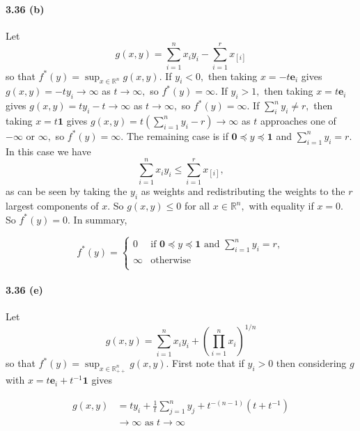 \documentclass[a4paper,12pt]{article}
\newcommand{\p}{\prod}
\newcommand{\e}{\mathbf{e}}
\begin{document}
\paragraph*{3.36 (b)}
Let $$g(x,y) = \sum_{i=1}^n x_i y_i - \sum_{i=1}^r x_{[i]}$$ so that $f^*(y) = \sup_{x\in \mathbb{R}^n} g(x,y).$
\newline
If $y_i < 0,$ then taking $ x = -t \e_i$ gives $g(x,y) = -ty_i \to \infty$ as $t\to\infty,$ so $f^*(y) = \infty.$
\newline
If $y_i > 1,$ then taking $x = t\e_i$ gives $g(x,y) = t y_i -t \to \infty$ as $t \to \infty,$ so $f^*(y) = \infty.$ 
\newline
If $\sum_{i}^n y_i \neq r,$ then taking $x = t \mathbf{1}$ gives $g(x,y) = t(\sum_{i=1}^n y_i -r) \to \infty$ as $t$ approaches one of $-\infty$ or $\infty,$ so $f^*(y) = \infty.$  
\newline
The remaining case is if $\mathbf{0} \preceq y \preceq \mathbf{1}$ and $\sum_{i=1}^n y_i = r.$ In this case we have $$\sum_{i=1}^n x_i y_i \leq \sum_{i=1}^r x_{[i]},$$ as can be seen by taking the $y_i$ as weights and redistributing the weights to the $r$ largest components of $x.$ So $g(x,y) \leq 0$ for all $x \in \mathbb{R}^n,$ with equality if $x=0.$ So $f^*(y) = 0.$ 
\newline
In summary, 

\[
  f^*(y) =
  \begin{cases}
                                   0 & \text{if $\mathbf{0} \preceq y \preceq \mathbf{1}$ and $\sum_{i=1}^n y_i = r,$} \\
                                   \infty & \text{otherwise} \\
  \end{cases}
\]

\paragraph*{3.36 (e)}

Let $$g(x,y) = \sum_{i=1}^n x_i y_i + \left(\p_{i=1}^n x_i \right)^{1/n}$$ so that $f^*(y) = \sup_{x\in \mathbb{R}^n_{++}} g(x,y).$ First note that if $y_i > 0 $ then considering $g$ with $x = t \e_i + t^{-1} \mathbf{1}$ gives 

\begin{align*}
 g(x,y) &= t y_i + \frac{1}{t} \sum_{j=1}^n y_j + t^{-(n-1)} (t + t^{-1}) \\
 & \to \infty \text{ as } t\to\infty\\
\end{align*}
\end{document}
